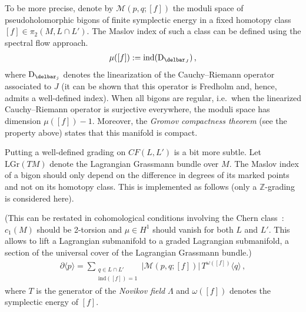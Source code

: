     To be more precise, denote by $\mathcal{M}(p,q;[f])$ the moduli space of pseudoholomorphic bigons of finite symplectic energy in a fixed homotopy class $[f]\in\pi_2(M,L\cap L')$. The Maslov index of such a class can be defined using the spectral flow approach.
    \begin{gather}
        \mu([f]) := \mathrm{ind}(\mathrm{D}_{\delbar_J})\,,
    \end{gather}
    where $\mathrm{D}_{\delbar_j}$ denotes the linearization of the Cauchy--Riemann operator associated to $J$ (it can be shown that this operator is Fredholm and, hence, admits a well-defined index). When all bigons are regular, i.e.~when the linearized Cauchy--Riemann operator is surjective everywhere, the moduli space has dimension $\mu([f])-1$. Moreover, the \textit{Gromov compactness theorem} (see the property above) states that this manifold is compact.

    Putting a well-defined grading on $C\!F(L,L')$ is a bit more subtle. Let $\mathrm{LGr}(TM)$ denote the Lagrangian Grassmann bundle over $M$. The Maslov index of a bigon should only depend on the difference in degrees of its marked points and not on its homotopy class. This is implemented as follows (only a $\mathbb{Z}$-grading is considered here).

    (This can be restated in cohomological conditions involving the Chern class~\citep{moshayedi_4-manifold_2021}: $c_1(M)$ should be 2-torsion and $\mu\in H^1$ should vanish for both $L$ and $L'$. This allows to lift a Lagrangian submanifold to a graded Lagrangian submanifold, a section of the universal cover of the Lagrangian Grassmann bundle.)
    \begin{gather}
        \partial\langle p \rangle = \sum_{\substack{q\in L\cap L'\\\mathrm{ind}([f])=1}}\big|\mathcal{M}(p,q;[f])\big|\,T^{\omega([f])}\langle q \rangle\,,
    \end{gather}
    where $T$ is the generator of the \textit{Novikov field} $\Lambda$ and $\omega([f])$ denotes the symplectic energy of $[f]$.

